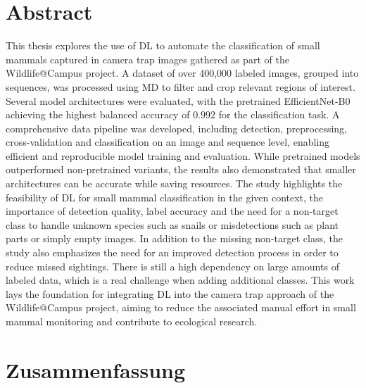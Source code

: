 

\vspace*{\fill}
\section*{Abstract}
\label{abstract}

This thesis explores the use of \ac{DL} to automate the classification of small mammals captured in camera trap images gathered as part of the Wildlife@Campus project.
A dataset of over 400,000 labeled images, grouped into sequences, was processed using \ac{MD} to filter and crop relevant regions of interest.
Several model architectures were evaluated, with the pretrained EfficientNet-B0 achieving the highest balanced accuracy of \(0.992\) for the classification task.
A comprehensive data pipeline was developed, including detection, preprocessing, cross-validation and classification on an image and sequence level, enabling efficient and reproducible model training and evaluation.
While pretrained models outperformed non-pretrained variants, the results also demonstrated that smaller architectures can be accurate while saving resources.
The study highlights the feasibility of DL for small mammal classification in the given context, the importance of detection quality, label accuracy and the need for a non-target class to handle unknown species such as snails or misdetections such as plant parts or simply empty images.
In addition to the missing non-target class, the study also emphasizes the need for an improved detection process in order to reduce missed sightings.
There is still a high dependency on large amounts of labeled data, which is a real challenge when adding additional classes.
This work lays the foundation for integrating \ac{DL} into the camera trap approach of the Wildlife@Campus project, aiming to reduce the associated manual effort in small mammal monitoring and contribute to ecological research.
\vspace*{\fill}

\newpage

\vspace*{\fill}
\section*{Zusammenfassung}

